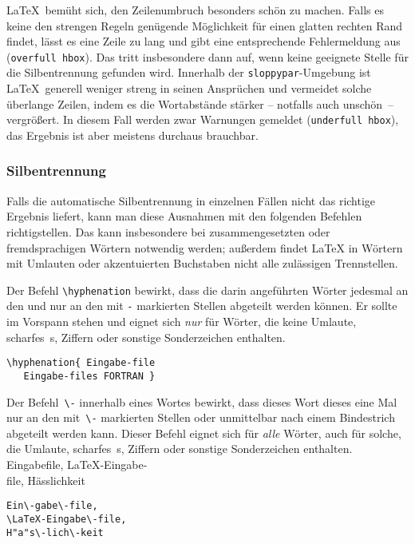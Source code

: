 \LaTeX\ bemüht sich, den Zeilenumbruch besonders schön zu
machen.  Falls es keine den strengen Regeln genügende
Möglichkeit für einen glatten rechten Rand findet, lässt es
eine Zeile zu lang und gibt eine entsprechende Fehlermeldung aus
(\texttt{over\-full hbox}).
Das tritt insbesondere dann auf, wenn keine geeignete Stelle
für die Silbentrennung gefunden wird.
Innerhalb der \texttt{sloppypar}-Umgebung ist \LaTeX\ generell
weniger streng in seinen Ansprüchen und vermeidet solche
überlange Zeilen, indem es die Wortabstände stärker --
notfalls auch unschön~-- vergrößert.
In diesem Fall werden zwar Warnungen gemeldet (\texttt{under\-full
hbox}), das Ergebnis ist aber meistens durchaus brauchbar.
 
 
\subsubsection{Silbentrennung} \label{silb}
 
Falls die automatische Silbentrennung in einzelnen Fällen nicht
das richtige Ergebnis liefert, kann man diese Ausnahmen mit den
folgenden Befehlen richtigstellen.
Das kann insbesondere bei zusammengesetzten oder fremdsprachigen
Wörtern notwendig werden; außerdem findet \LaTeX{} in Wörtern
mit Umlauten oder akzentuierten Buchstaben nicht alle zulässigen
Trennstellen.
 
Der Befehl \verb|\hyphenation| bewirkt, dass die darin
angeführten Wörter jedesmal an den und nur an den mit
\verb|-| markierten Stellen abgeteilt werden können.
Er sollte im Vorspann stehen und eignet sich
\emph{nur} für Wörter, die keine Umlaute, scharfes~s,
Ziffern oder sonstige Sonderzeichen enthalten.
\exa
~
\exb
\begin{verbatim}
\hyphenation{ Eingabe-file
   Eingabe-files FORTRAN }
\end{verbatim}
\exc
 
Der Befehl~\verb|\-| innerhalb eines Wortes bewirkt, dass dieses
Wort dieses eine Mal nur an den mit~\verb|\-|
markierten Stellen 
oder unmittelbar nach einem Bindestrich
abgeteilt werden kann.
Dieser Befehl eignet sich für \emph{alle} Wörter, auch für
solche, die Umlaute, scharfes~s, Ziffern oder sonstige
Sonderzeichen enthalten.
\exa
Eingabefile, \LaTeX-Eingabe-\\
file, Hässlichkeit
\exb
\begin{verbatim}
Ein\-gabe\-file,
\LaTeX-Eingabe\-file,
H"a"s\-lich\-keit
\end{verbatim}
\exc


